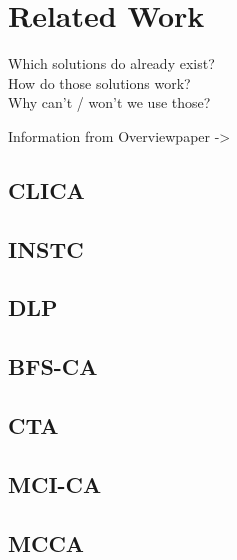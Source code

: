 \chapter{Related Work}
\begin{description}
 \item [Which solutions do already exist?]
 \item[How do those solutions work?]
 \item[Why can't / won't we use those?]
\end{description}
Information from Overviewpaper -> \cite{overview_caa}
\section{CLICA}
\section{INSTC}
\section{DLP}
\section{BFS-CA}
\section{CTA}
\section{MCI-CA}
\section{MCCA}
